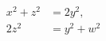 \begin{proposition}\label{eq:013}
\[
    \begin{aligned}x^2+z^2&=2y^2,\\2z^2&=y^2+w^2\end{aligned}
\]
\end{proposition}
